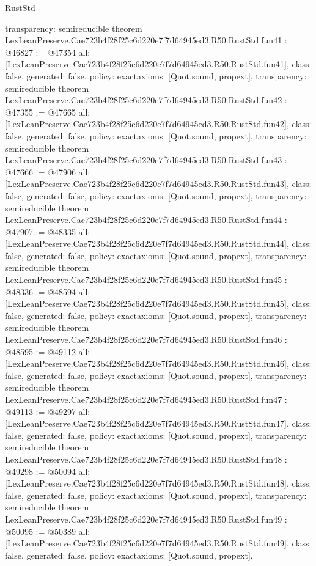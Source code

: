 \begin{lexlean}{RustStd}
\begin{coremodule}
{  transparency: semireducible
}
theorem LexLeanPreserve.Cae723b4f28f25c6d220e7f7d64945ed3.R50.RustStd.fun41 : @46827 := @47354 {
  all: [LexLeanPreserve.Cae723b4f28f25c6d220e7f7d64945ed3.R50.RustStd.fun41],
  class: false,
  generated: false,
  policy: exact{axioms: [Quot.sound, propext]},
  transparency: semireducible
}
theorem LexLeanPreserve.Cae723b4f28f25c6d220e7f7d64945ed3.R50.RustStd.fun42 : @47355 := @47665 {
  all: [LexLeanPreserve.Cae723b4f28f25c6d220e7f7d64945ed3.R50.RustStd.fun42],
  class: false,
  generated: false,
  policy: exact{axioms: [Quot.sound, propext]},
  transparency: semireducible
}
theorem LexLeanPreserve.Cae723b4f28f25c6d220e7f7d64945ed3.R50.RustStd.fun43 : @47666 := @47906 {
  all: [LexLeanPreserve.Cae723b4f28f25c6d220e7f7d64945ed3.R50.RustStd.fun43],
  class: false,
  generated: false,
  policy: exact{axioms: [Quot.sound, propext]},
  transparency: semireducible
}
theorem LexLeanPreserve.Cae723b4f28f25c6d220e7f7d64945ed3.R50.RustStd.fun44 : @47907 := @48335 {
  all: [LexLeanPreserve.Cae723b4f28f25c6d220e7f7d64945ed3.R50.RustStd.fun44],
  class: false,
  generated: false,
  policy: exact{axioms: [Quot.sound, propext]},
  transparency: semireducible
}
theorem LexLeanPreserve.Cae723b4f28f25c6d220e7f7d64945ed3.R50.RustStd.fun45 : @48336 := @48594 {
  all: [LexLeanPreserve.Cae723b4f28f25c6d220e7f7d64945ed3.R50.RustStd.fun45],
  class: false,
  generated: false,
  policy: exact{axioms: [Quot.sound, propext]},
  transparency: semireducible
}
theorem LexLeanPreserve.Cae723b4f28f25c6d220e7f7d64945ed3.R50.RustStd.fun46 : @48595 := @49112 {
  all: [LexLeanPreserve.Cae723b4f28f25c6d220e7f7d64945ed3.R50.RustStd.fun46],
  class: false,
  generated: false,
  policy: exact{axioms: [Quot.sound, propext]},
  transparency: semireducible
}
theorem LexLeanPreserve.Cae723b4f28f25c6d220e7f7d64945ed3.R50.RustStd.fun47 : @49113 := @49297 {
  all: [LexLeanPreserve.Cae723b4f28f25c6d220e7f7d64945ed3.R50.RustStd.fun47],
  class: false,
  generated: false,
  policy: exact{axioms: [Quot.sound, propext]},
  transparency: semireducible
}
theorem LexLeanPreserve.Cae723b4f28f25c6d220e7f7d64945ed3.R50.RustStd.fun48 : @49298 := @50094 {
  all: [LexLeanPreserve.Cae723b4f28f25c6d220e7f7d64945ed3.R50.RustStd.fun48],
  class: false,
  generated: false,
  policy: exact{axioms: [Quot.sound, propext]},
  transparency: semireducible
}
theorem LexLeanPreserve.Cae723b4f28f25c6d220e7f7d64945ed3.R50.RustStd.fun49 : @50095 := @50389 {
  all: [LexLeanPreserve.Cae723b4f28f25c6d220e7f7d64945ed3.R50.RustStd.fun49],
  class: false,
  generated: false,
  policy: exact{axioms: [Quot.sound, propext]},
}
\end{coremodule}
\end{lexlean}
